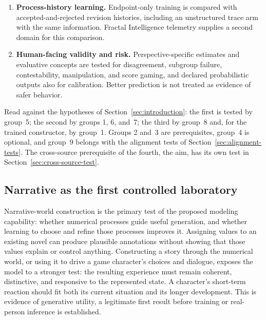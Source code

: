 \documentclass[10pt]{article}
\begin{document}
\begin{enumerate}
    consented longitudinal data are frozen at their historical cutoff and
    scored only against later evidence, following Temporal Hindsight Learning
    discipline~\cite{westerbergTHL2026}.
  \item \textbf{Process-history learning.} Endpoint-only training is compared
    with accepted-and-rejected revision histories, including an unstructured
    trace arm with the same information. Fractal Intelligence telemetry supplies
    a second domain for this comparison.
  \item \textbf{Human-facing validity and risk.} Perspective-specific estimates and
    evaluative concepts are tested for disagreement, subgroup failure,
    contestability, manipulation, and score gaming, and declared probabilistic
    outputs also for calibration. Better prediction
    is not treated as evidence of safer behavior.
\end{enumerate}

Read against the hypotheses of Section~\ref{sec:introduction}: the first is tested
by group~5; the second by groups 1, 6, and~7; the third by group~8 and, for the
trained constructor, by group~1. Groups 2 and~3 are prerequisites, group~4 is
optional, and group~9 belongs with the alignment tests of
Section~\ref{sec:alignment-tests}. The cross-source prerequisite of the fourth,
the aim, has its own test in Section~\ref{sec:cross-source-test}.

\subsection{Narrative as the first controlled laboratory}
\label{sec:narrative-laboratory}

Narrative-world construction is the primary test of the proposed modeling
capability: whether numerical processes guide useful generation, and whether
learning to choose and refine those processes improves it.
Assigning values to an existing novel can produce plausible annotations
without showing that those values explain or control anything. Constructing a
story through the numerical world, or using it to drive a game character's
choices and dialogue, exposes the model to a stronger test: the resulting
experience must remain coherent, distinctive, and responsive to the represented
state. A character's short-term reaction should fit both its current situation
and its longer development. This is evidence of generative utility, a legitimate
first result before training or real-person inference is established.
\end{document}
